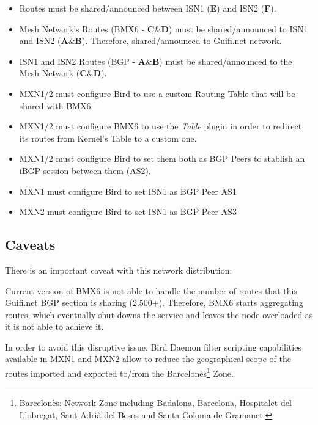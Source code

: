 \begin{itemize}
    \item Routes must be shared/announced between ISN1 (\textbf{E}) and ISN2 (\textbf{F}).
    \item Mesh Network's Routes (BMX6 - \textbf{C}\&\textbf{D}) must be shared/announced to ISN1 and ISN2 (\textbf{A}\&\textbf{B}). Therefore, shared/announced to Guifi.net network.
    \item ISN1 and ISN2 Routes (BGP - \textbf{A}\&\textbf{B}) must be shared/announced to the Mesh Network (\textbf{C}\&\textbf{D}).
    \item MXN1/2 must configure Bird to use a custom Routing Table that will be shared with BMX6.
    \item MXN1/2 must configure BMX6 to use the \textit{Table} plugin in order to redirect its routes from Kernel's Table to a custom one.
    \item MXN1/2 must configure Bird to set them both as BGP Peers to stablish an iBGP session between them (AS2).
    \item MXN1 must configure Bird to set ISN1 as BGP Peer AS1
    \item MXN2 must configure Bird to set ISN1 as BGP Peer AS3
\end{itemize}

\subsection{Caveats}
There is an important caveat with this network distribution:

Current version of BMX6 is not able to handle the number of routes that this Guifi.net BGP section is sharing (2.500+). Therefore, BMX6 starts aggregating routes, which eventually shut-downs the service and leaves the node overloaded as it is not able to achieve it.

In order to avoid this disruptive issue, Bird Daemon filter scripting capabilities available in MXN1 and MXN2 allow to reduce the geographical scope of the routes imported and exported to/from the Barcelon\`{e}s\footnote{\href{https://guifi.net/en/barcelones}{Barcelon\`{e}s}: Network Zone including Badalona, Barcelona, Hospitalet del Llobregat, Sant Adri\`{a} del Besos and Santa Coloma de Gramanet.} Zone.

